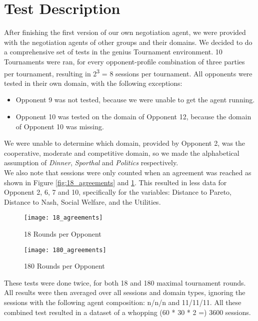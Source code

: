 \section{Test Description}

After finishing the first version of our own negotiation agent, we were provided with the negotiation agents of other groups and their domains. We decided to do a comprehensive set of tests in the genius Tournament environment. 10 Tournaments were ran, for every opponent-profile combination of three parties per tournament, resulting in 2\textsuperscript{3} = 8 sessions per tournament. All opponents were tested in their own domain, with the following exceptions:

\begin{itemize}
	\item Opponent 9 was not tested, because we were unable to get the agent running. 
	\item Opponent 10 was tested on the domain of Opponent 12, because the domain of Opponent 10 was missing.
\end{itemize}

We were unable to determine which domain, provided by Opponent 2, was the cooperative, moderate and competitive domain, so we made the alphabetical assumption of \textit{Dinner}, \textit{Sporthal} and \textit{Politics} respectively. \\

We also note that sessions were only counted when an agreement was reached as shown in Figure \ref{fig:18_agreements} and \ref{fig:180_agreements}. This resulted in less data for Opponent 2, 6, 7 and 10, specifically for the variables: Distance to Pareto, Distance to Nash, Social Welfare, and the Utilities.

\begin{figure}[!htb]
	\texttt{[image: 18\_agreements]}
	\caption{18 Rounds per Opponent}
	\label{fig:18_agreements}
	\endminipage\hfill
	\texttt{[image: 180\_agreements]}
	\caption{180 Rounds per Opponent}
	\label{fig:180_agreements}
	\endminipage\hfill
\end{figure}

These tests were done twice, for both 18 and 180 maximal tournament rounds.
All results were then averaged over all sessions and domain types, ignoring the sessions with the following agent composition: n/n/n and 11/11/11. All these combined test resulted in a dataset of a whopping (60 * 30 * 2 =) 3600 sessions.